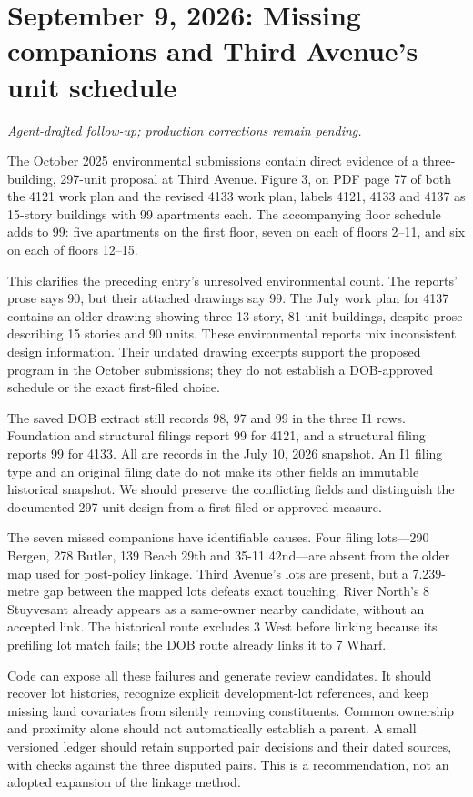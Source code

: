\clearpage
\section*{September 9, 2026: Missing companions and Third Avenue's unit schedule}
\textit{Agent-drafted follow-up; production corrections remain pending.}

The October 2025 environmental submissions contain direct evidence of a three-building, 297-unit proposal at Third Avenue. Figure 3, on PDF page 77 of both the 4121 work plan and the revised 4133 work plan, labels 4121, 4133 and 4137 as 15-story buildings with 99 apartments each. The accompanying floor schedule adds to 99: five apartments on the first floor, seven on each of floors 2--11, and six on each of floors 12--15.

This clarifies the preceding entry's unresolved environmental count. The reports' prose says 90, but their attached drawings say 99. The July work plan for 4137 contains an older drawing showing three 13-story, 81-unit buildings, despite prose describing 15 stories and 90 units. These environmental reports mix inconsistent design information. Their undated drawing excerpts support the proposed program in the October submissions; they do not establish a DOB-approved schedule or the exact first-filed choice.

The saved DOB extract still records 98, 97 and 99 in the three I1 rows. Foundation and structural filings report 99 for 4121, and a structural filing reports 99 for 4133. All are records in the July 10, 2026 snapshot. An I1 filing type and an original filing date do not make its other fields an immutable historical snapshot. We should preserve the conflicting fields and distinguish the documented 297-unit design from a first-filed or approved measure.

The seven missed companions have identifiable causes. Four filing lots---290 Bergen, 278 Butler, 139 Beach 29th and 35-11 42nd---are absent from the older map used for post-policy linkage. Third Avenue's lots are present, but a 7.239-metre gap between the mapped lots defeats exact touching. River North's 8 Stuyvesant already appears as a same-owner nearby candidate, without an accepted link. The historical route excludes 3 West before linking because its prefiling lot match fails; the DOB route already links it to 7 Wharf.

Code can expose all these failures and generate review candidates. It should recover lot histories, recognize explicit development-lot references, and keep missing land covariates from silently removing constituents. Common ownership and proximity alone should not automatically establish a parent. A small versioned ledger should retain supported pair decisions and their dated sources, with checks against the three disputed pairs. This is a recommendation, not an adopted expansion of the linkage method.

